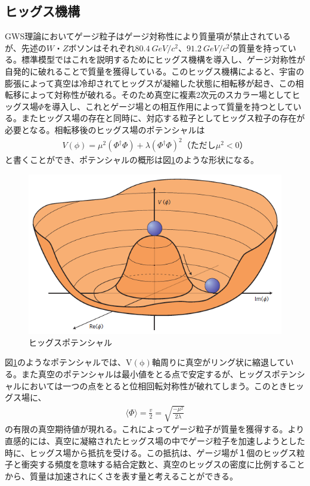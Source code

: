 \subsection{ヒッグス機構}
GWS理論においてゲージ粒子はゲージ対称性により質量項が禁止されているが、先述の$W$・$Z$ボソンはそれぞれ$\SI{80.4}{GeV/c^2}$、$\SI{91.2}{GeV/c^2}$の質量を持っている。標準模型ではこれを説明するためにヒッグス機構を導入し、ゲージ対称性が自発的に破れることで質量を獲得している。このヒッグス機構によると、宇宙の膨張によって真空は冷却されてヒッグスが凝縮した状態に相転移が起き、この相転移によって対称性が破れる。そのため真空に複素2次元のスカラー場としてヒッグス場$\Phi$を導入し、これとゲージ場との相互作用によって質量を持つとしている。またヒッグス場の存在と同時に、対応する粒子としてヒッグス粒子の存在が必要となる。相転移後のヒッグス場のポテンシャル\cite{gaugehiggs}は
\begin{align}
V(\phi) = {\mu}^2({\Phi}^\dag \Phi) + \lambda ({\Phi}^\dag \Phi)^2　（ただし{\mu}^2 < 0）
\end{align}
と書くことができ、ポテンシャルの概形は図\ref{higgspotential}のような形状になる。
\begin{figure}[H]
	\begin{center}
 \includegraphics[keepaspectratio, scale=0.3]
 	{Figure/Introduction/higgspotential.png}
 		\caption[ヒッグスポテンシャル]{ヒッグスポテンシャル\cite{higgspotential}}
 		\label{higgspotential}
	\end{center}
\end{figure}

図\ref{higgspotential}のようなポテンシャルでは、$\mathrm{V(\phi)}$軸周りに真空がリング状に縮退している。また真空のポテンシャルは最小値をとる点で安定するが、ヒッグスポテンシャルにおいては一つの点をとると位相回転対称性が破れてしまう。このときヒッグス場に、
\begin{align}
\label{higgsvalue}
\langle \Phi \rangle = \frac{v}{2} = \sqrt{\frac{-{\mu}^2}{2\lambda}}
\end{align}
の有限の真空期待値が現れる。これによってゲージ粒子が質量を獲得する。より直感的には、真空に凝縮されたヒッグス場の中でゲージ粒子を加速しようとした時に、ヒッグス場から抵抗を受ける。この抵抗は、ゲージ場が１個のヒッグス粒子と衝突する頻度を意味する結合定数と、真空のヒッグスの密度に比例することから、質量は加速されにくさを表す量と考えることができる。

